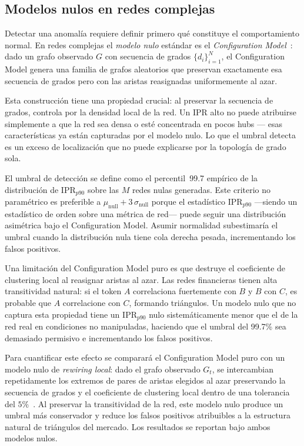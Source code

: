 \subsection{Modelos nulos en redes complejas}

Detectar una anomalía requiere definir primero qué constituye el
comportamiento normal. En redes complejas el \emph{modelo nulo} estándar
es el \emph{Configuration Model}~\cite{newman2003}: dado un grafo
observado $G$ con secuencia de grados $\{d_i\}_{i=1}^N$, el
Configuration Model genera una familia de grafos aleatorios que preservan
exactamente esa secuencia de grados pero con las aristas reasignadas
uniformemente al azar.

Esta construcción tiene una propiedad crucial: al preservar la secuencia
de grados, controla por la densidad local de la red. Un IPR alto no
puede atribuirse simplemente a que la red sea densa o esté concentrada
en pocos hubs --- esas características ya están capturadas por el modelo
nulo. Lo que el umbral detecta es un exceso de localización que no puede
explicarse por la topología de grado sola.

El umbral de detección se define como el percentil~99.7 empírico de la
distribución de $\mathrm{IPR}_{p90}$ sobre las $M$ redes nulas
generadas. Este criterio no paramétrico es preferible a $\mu_{\text{null}}
+ 3\,\sigma_{\text{null}}$ porque el estadístico $\mathrm{IPR}_{p90}$
---siendo un estadístico de orden sobre una métrica de red--- puede
seguir una distribución asimétrica bajo el Configuration Model. Asumir
normalidad subestimaría el umbral cuando la distribución nula tiene cola
derecha pesada, incrementando los falsos positivos.

Una limitación del Configuration Model puro es que destruye el
coeficiente de clustering local al reasignar aristas al azar. Las redes
financieras tienen alta transitividad natural: si el token $A$ correlaciona
fuertemente con $B$ y $B$ con $C$, es probable que $A$ correlacione con
$C$, formando triángulos. Un modelo nulo que no captura esta propiedad
tiene un $\mathrm{IPR}_{p90}$ nulo sistemáticamente menor que el de la
red real en condiciones no manipuladas, haciendo que el umbral del
99.7\% sea demasiado permisivo e incrementando los falsos positivos.

Para cuantificar este efecto se comparará el Configuration Model puro
con un modelo nulo de \emph{rewiring local}: dado el grafo observado
$G_t$, se intercambian repetidamente los extremos de pares de aristas
elegidos al azar preservando la secuencia de grados y el coeficiente de
clustering local dentro de una tolerancia del $5\%$~\cite{maslov2002}.
Al preservar la transitividad de la red, este modelo nulo produce un
umbral más conservador y reduce los falsos positivos atribuibles a la
estructura natural de triángulos del mercado. Los resultados se reportan
bajo ambos modelos nulos.

